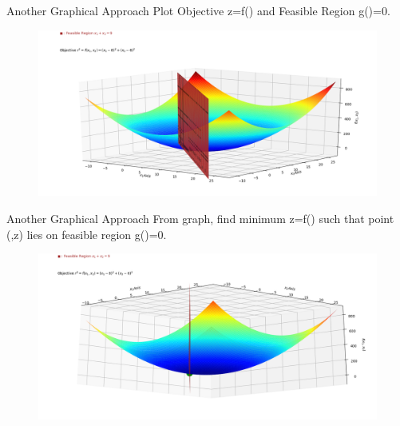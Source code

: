 \documentclass[10pt]{beamer}
\begin{document}
\begin{frame}{Another Graphical Approach}
Plot Objective z=f() and Feasible Region g()=0.
  \begin{figure}[h]
\includegraphics[scale = 0.34]{Figure_1.png}
\end{figure}   
\end{frame}

\begin{frame}{Another Graphical Approach}
From graph, find minimum z=f() such that point (,z) lies on feasible region g()=0.
     \begin{figure}[h]
\includegraphics[scale = 0.34]{Figure_2.png}
\end{figure}
\end{frame}
\end{document}
